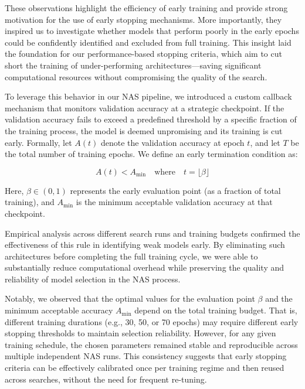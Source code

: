 These observations highlight the efficiency of early training and provide strong motivation for the use of early stopping mechanisms. More importantly, they inspired us to investigate whether models that perform poorly in the early epochs could be confidently identified and excluded from full training. This insight laid the foundation for our performance-based stopping criteria, which aim to cut short the training of under-performing architectures—saving significant computational resources without compromising the quality of the search.

To leverage this behavior in our NAS pipeline, we introduced a custom callback mechanism that monitors validation accuracy at a strategic checkpoint. If the validation accuracy fails to exceed a predefined threshold by a specific fraction of the training process, the model is deemed unpromising and its training is cut early. Formally, let \( A(t) \) denote the validation accuracy at epoch \( t \), and let \( T \) be the total number of training epochs. We define an early termination condition as:

\[
A(t) < A_{\min} \quad \text{where} \quad t = \lfloor \beta \rfloor
\]

Here, \( \beta \in (0,1) \) represents the early evaluation point (as a fraction of total training), and \( A_{\min} \) is the minimum acceptable validation accuracy at that checkpoint.

Empirical analysis across different search runs and training budgets confirmed the effectiveness of this rule in identifying weak models early. By eliminating such architectures before completing the full training cycle, we were able to substantially reduce computational overhead while preserving the quality and reliability of model selection in the NAS process.


Notably, we observed that the optimal values for the evaluation point \( \beta \) and the minimum acceptable accuracy \( A_{\min} \) depend on the total training budget. That is, different training durations (e.g., 30, 50, or 70 epochs) may require different early stopping thresholds to maintain selection reliability. However, for any given training schedule, the chosen parameters remained stable and reproducible across multiple independent NAS runs. This consistency suggests that early stopping criteria can be effectively calibrated once per training regime and then reused across searches, without the need for frequent re-tuning.




